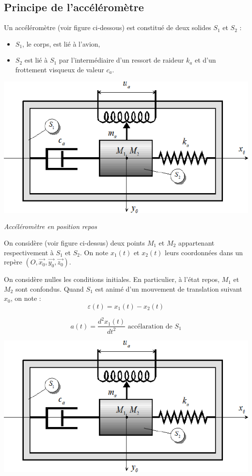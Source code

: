 \documentclass[10pt,fleqn]{article} %
\begin{document}
\begin{multicols}{2}
\subsection*{Principe de l’accéléromètre}
\ifprof
\else

Un accéléromètre (voir figure ci-dessous) est constitué de deux solides
$S_1$ et $S_2$ :
\begin{itemize}
\item $S_1$, le corps, est lié à l’avion,
\item $S_2$ est lié à $S_1$ par l’intermédiaire d’un ressort de raideur $k_a$ et d’un frottement visqueux de valeur $c_a$.
\end{itemize}

\begin{center}
\includegraphics[width=.5\linewidth]{images/image12.png}

\textit{Accéléromètre en position repos}
\end{center}

On considère (voir figure ci-dessus) deux points $M_1$ et $M_2$ appartenant respectivement à $S_1$ et $S_2$. On note
$x_1(t)$ et $x_2(t)$ leurs coordonnées dans un repère 
$\left(O,\overrightarrow{x_0},\overrightarrow{y_0},\overrightarrow{z_0}\right)$.

On considère nulles les conditions initiales. En particulier, à l’état repos, $M_1$ et $M_2$ sont confondus.
Quand $S_1$ est animé d’un mouvement de translation suivant $x_0$, on note :
\begin{equation}
\varepsilon(t)=x_1(t)-x_2(t)
\end{equation}

\begin{equation}
a(t)=\dfrac{d^2x_1(t)}{dt^2} \text{ accélaration de } S_1
\end{equation}


\begin{center}
\includegraphics[width=.5\linewidth]{images/image12.png}


\end{center}
\end{multicols}
\end{document}
